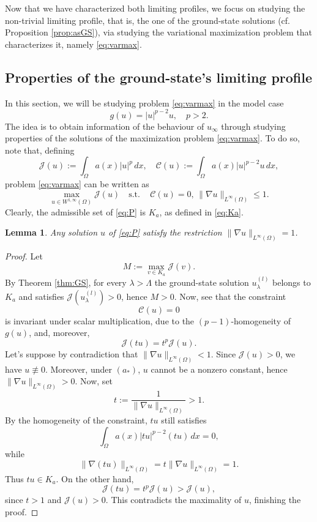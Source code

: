 \documentclass[11pt,reqno]{amsart}
\theoremstyle{plain}
\newtheorem{lemma}[theorem]{Lemma}
\theoremstyle{definition}
\numberwithin{equation}{section}
\begin{document}
Now that we have characterized both limiting profiles, we focus on studying the non-trivial limiting profile, that is, the one of the ground-state solutions (cf. Proposition \ref{prop:asGS}), via studying the variational maximization problem that characterizes it, namely \eqref{eq:varmax}. 


\subsection{Properties of the ground-state's limiting profile}
In this section, we will be studying problem \eqref{eq:varmax} in the model case
$$g(u) = |u|^{p-2} u, \quad p>2.$$
The idea is to obtain information of the behaviour of $u_\infty$ through studying properties of the solutions of the maximization problem \eqref{eq:varmax}. To do so, note that, defining
\begin{equation} \label{eq:defJC} \mathcal{J}(u) := \int_\Omega a(x) |u|^{p} \, dx, \quad \mathcal{C}(u) := \int_\Omega a(x) |u|^{p-2}u \, dx,\end{equation}
problem \eqref{eq:varmax} can be written as
\begin{equation}\label{eq:P} \tag{P}  \max_{u \in W^{1,\infty}(\Omega)} \mathcal J(u) \quad \text{s.t.} \,\quad \mathcal{C}(u) = 0, \,   \|\nabla u \|_{L^{\infty}(\Omega)} \leq 1  .
\end{equation}
Clearly, the admissible set of \eqref{eq:P} is $K_a$, as defined in \eqref{eq:Ka}. 
\begin{lemma} \label{lemma:saturation}
    Any solution $u$ of \eqref{eq:P} satisfy the restriction $\|\nabla u \|_{L^{\infty}(\Omega)} = 1$. 
\end{lemma}
\begin{proof}
     Let
    $$
    M:=\max_{v\in K_a}\mathcal{J}(v).
    $$
    By Theorem \ref{thm:GS}, for every $\lambda>\Lambda$ the ground-state
    solution $u_\lambda^{(l)}$ belongs to $K_a$ and satisfies
    $\mathcal{J}(u_\lambda^{(l)})>0$, hence $M>0$. Now, see that the constraint
    $$
    \mathcal{C}(u) = 0
    $$
    is invariant under scalar multiplication, due to the $(p-1)$-homogeneity of $g(u)$, and, moreover,
    $$
    \mathcal{J}(tu)=t^p\mathcal{J}(u).
    $$
    Let's suppose by contradiction that $\|\nabla u\|_{L^\infty(\Omega)}<1$. Since $\mathcal{J}(u)>0$, we have $u\not\equiv0$. Moreover, under $(a_\ast)$, $u$ cannot be a nonzero constant, hence $\|\nabla u\|_{L^\infty(\Omega)}>0$. Now, set
    $$
    t:=\frac{1}{\|\nabla u\|_{L^\infty(\Omega)}}>1.
    $$
    By the homogeneity of the constraint,
    $tu$ still satisfies
    $$
    \int_\Omega a(x)|tu|^{p-2}(tu)\,dx=0,
    $$
    while
    $$
    \|\nabla(tu)\|_{L^\infty(\Omega)}
    =t\|\nabla u\|_{L^\infty(\Omega)}=1.
    $$
    Thus $tu\in K_a$. On the other hand,
    $$
    \mathcal{J}(tu)
    =t^p\mathcal{J}(u)
    >\mathcal{J}(u),
    $$
    since $t>1$ and $\mathcal{J}(u)>0$. This contradicts the maximality of $u$, finishing the proof.
\end{proof}
\end{document}
